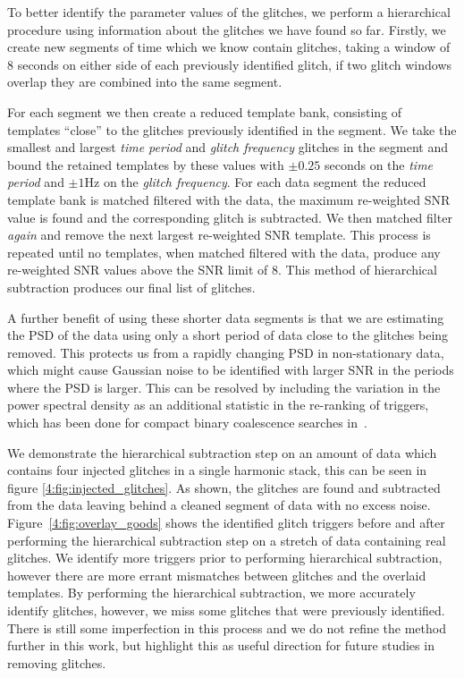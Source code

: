 To better identify the parameter values of the \scl{} glitches, we perform a hierarchical procedure using information about the glitches we have found so far. Firstly, we create new segments of time which we know contain \scl{} glitches, taking a window of $8$ seconds on either side of each previously identified glitch, if two glitch windows overlap they are combined into the same segment.

For each segment we then create a reduced template bank, consisting of templates ``close'' to the \scl{} glitches previously identified in the segment. We take the smallest and largest \emph{time period} and \emph{glitch frequency} glitches in the segment and bound the retained templates by these values with $\pm 0.25$ seconds on the \emph{time period} and $\pm 1$Hz on the \emph{glitch frequency}. For each data segment the reduced template bank is matched filtered with the data, the maximum re-weighted SNR value is found and the corresponding glitch is subtracted. We then matched filter \emph{again} and remove the next largest re-weighted SNR template. This process is repeated until no templates, when matched filtered with the data, produce any re-weighted SNR values above the SNR limit of $8$. This method of hierarchical subtraction produces our final list of \scl{} glitches.

A further benefit of using these shorter data segments is that we are estimating the PSD of the data using only a short period of data close to the \scl{} glitches being removed. This protects us from a rapidly changing PSD in non-stationary data, which might cause Gaussian noise to be identified with larger SNR in the periods where the PSD is larger. This can be resolved by including the variation in the power spectral density as an additional statistic in the re-ranking of triggers, which has been done for compact binary coalescence \gw{} searches in~\cite{PSD_var:2020}.

We demonstrate the hierarchical subtraction step on an amount of data which contains four injected \scl{} glitches in a single harmonic stack, this can be seen in figure \ref{4:fig:injected_glitches}. As shown, the \scl{} glitches are found and subtracted from the data leaving behind a cleaned segment of \gw{} data with no excess noise. Figure~\ref{4:fig:overlay_goods} shows the identified \scl{} glitch triggers before and after performing the hierarchical subtraction step on a stretch of data containing real \scl{} glitches. We identify more triggers prior to performing hierarchical subtraction, however there are more errant mismatches between \scl{} glitches and the overlaid templates. By performing the hierarchical subtraction, we more accurately identify \scl{} glitches, however, we miss some glitches that were previously identified. There is still some imperfection in this process and we do not refine the method further in this work, but highlight this as useful direction for future studies in removing \scl{} glitches. 

